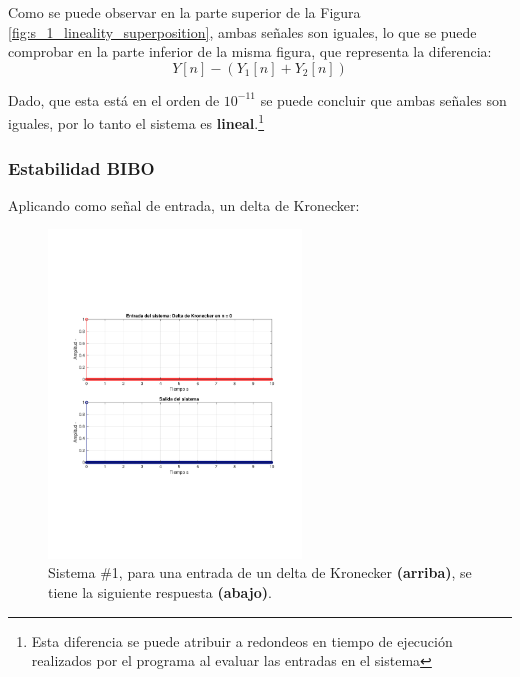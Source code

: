 			Como se puede observar en la parte superior de la Figura \ref{fig:s_1_lineality_superposition}, ambas señales son iguales, lo que se puede comprobar en la parte inferior de la misma figura, que representa la diferencia:
			\begin{equation*}
				Y [n] -  \left( Y_{1} [n] + Y_{2}[n] \right) 
			\end{equation*}
			
			Dado, que esta está en el orden de $10^{-11}$ se puede concluir que ambas señales son iguales, por lo tanto el sistema es \textbf{lineal}.\footnote{Esta diferencia se puede atribuir a redondeos en tiempo de ejecución realizados por el programa al evaluar las entradas en el sistema}
			
		\subsubsection{Estabilidad BIBO}
			Aplicando como señal de entrada, un delta de Kronecker: 
			\begin{figure}[H]
				\center
				\includegraphics[width=0.6\textwidth,clip, trim = {2cm 7.0cm 2.2cm 7.0cm}]{../imgs/sistema_1_bibo_n_0.pdf}
				\caption{Sistema \#1, para una entrada de un delta de Kronecker \textbf{(arriba)}, se tiene la siguiente respuesta \textbf{(abajo)}.}
				\label{fig:s_1_bibo_0}
			\end{figure}
			
